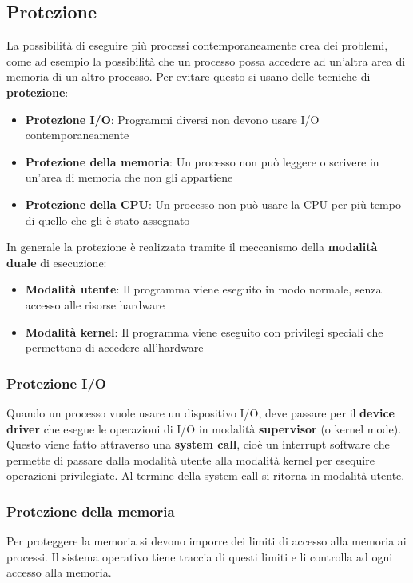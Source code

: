 \documentclass[a4paper]{article}
\begin{document}
\subsection{Protezione}
La possibilità di eseguire più processi contemporaneamente crea dei problemi, come ad
esempio la possibilità che un processo possa accedere ad un'altra area di memoria di
un altro processo. Per evitare questo si usano delle tecniche di \textbf{protezione}:
\begin{itemize}
  \item \textbf{Protezione I/O}: Programmi diversi non devono usare I/O contemporaneamente
  \item \textbf{Protezione della memoria}: Un processo non può leggere o scrivere in un'area di
    memoria che non gli appartiene
  \item \textbf{Protezione della CPU}: Un processo non può usare la CPU per più tempo di quello
    che gli è stato assegnato
\end{itemize}
In generale la protezione è realizzata tramite il meccanismo della \textbf{modalità duale}
di esecuzione:
\begin{itemize}
  \item \textbf{Modalità utente}: Il programma viene eseguito in modo normale, senza accesso
    alle risorse hardware
  \item \textbf{Modalità kernel}: Il programma viene eseguito con privilegi speciali
    che permettono di accedere all'hardware
\end{itemize}

\subsubsection{Protezione I/O}
Quando un processo vuole usare un dispositivo I/O, deve passare per il \textbf{device
driver} che esegue le operazioni di I/O in modalità \textbf{supervisor} (o kernel mode).
Questo viene fatto attraverso una \textbf{system call}, cioè un interrupt software
che permette di passare dalla modalità utente alla modalità kernel per
esequire operazioni privilegiate. Al termine della system call si ritorna in modalità
utente.

\subsubsection{Protezione della memoria}
Per proteggere la memoria si devono imporre dei limiti di accesso alla memoria ai processi.
Il sistema operativo tiene traccia di questi limiti e li controlla ad ogni accesso alla 
memoria. 
\end{document}
